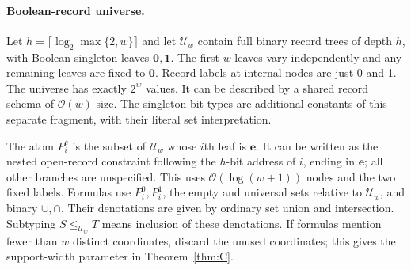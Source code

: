 \documentclass[11pt,letterpaper]{article}
\theoremstyle{definition}\newtheorem{definition}[theorem]{Definition}
\newcommand{\Oh}{\mathcal O}
\begin{document}
\paragraph{Boolean-record universe.}
Let $h=\lceil\log_2\max\{2,w\}\rceil$ and let $\mathcal U_w$ contain full binary record trees of depth $h$, with Boolean singleton leaves $\mathbf 0,\mathbf 1$. The first $w$ leaves vary independently and any remaining leaves are fixed to $\mathbf0$. Record labels at internal nodes are just 0 and 1. The universe has exactly $2^w$ values. It can be described by a shared record schema of $\Oh(w)$ size. The singleton bit types are additional constants of this separate fragment, with their literal set interpretation.

The atom $P_i^e$ is the subset of $\mathcal U_w$ whose $i$th leaf is $\mathbf e$. It can be written as the nested open-record constraint following the $h$-bit address of $i$, ending in $\mathbf e$; all other branches are unspecified. This uses $\Oh(\log(w+1))$ nodes and the two fixed labels. Formulas use $P_i^0,P_i^1$, the empty and universal sets relative to $\mathcal U_w$, and binary $\cup,\cap$. Their denotations are given by ordinary set union and intersection. Subtyping $S\le_{\mathcal U_w}T$ means inclusion of these denotations. If formulas mention fewer than $w$ distinct coordinates, discard the unused coordinates; this gives the support-width parameter in Theorem~\ref{thm:C}.
\end{document}

